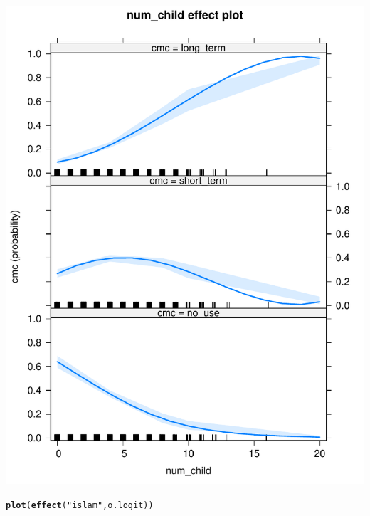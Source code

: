 \documentclass[onesided]{article}\usepackage[]{graphicx}\usepackage[]{color}
\makeatletter
\def\maxwidth{ %
  \ifdim\Gin@nat@width>\linewidth
    \linewidth
  \else
    \Gin@nat@width
  \fi
}
\newcommand{\hlstr}[1]{\textcolor[rgb]{0.192,0.494,0.8}{#1}}%
\newcommand{\hlstd}[1]{\textcolor[rgb]{0.345,0.345,0.345}{#1}}%
\newcommand{\hlkwd}[1]{\textcolor[rgb]{0.737,0.353,0.396}{\textbf{#1}}}%
\newenvironment{kframe}{%
 \def\at@end@of@kframe{}%
 \ifinner\ifhmode%
  \def\at@end@of@kframe{\end{minipage}}%
  \begin{minipage}{\columnwidth}%
 \fi\fi%
 \def\FrameCommand##1{\hskip\@totalleftmargin \hskip-\fboxsep
 \colorbox{shadecolor}{##1}\hskip-\fboxsep
     \hskip-\linewidth \hskip-\@totalleftmargin \hskip\columnwidth}%
 \MakeFramed {\advance\hsize-\width
   \@totalleftmargin\z@ \linewidth\hsize
   \@setminipage}}%
 {\par\unskip\endMakeFramed%
 \at@end@of@kframe}
\newenvironment{knitrout}{}{} %
\makeatother
\begin{document}
\begin{knitrout}
{\centering \includegraphics[width=\maxwidth]{figure/pp-3} 

}


\begin{kframe}\begin{alltt}
\hlkwd{plot}\hlstd{(}\hlkwd{effect}\hlstd{(}\hlstr{"islam"}\hlstd{, o.logit))}
\end{alltt}
\end{kframe}


\end{knitrout}
\end{document}
